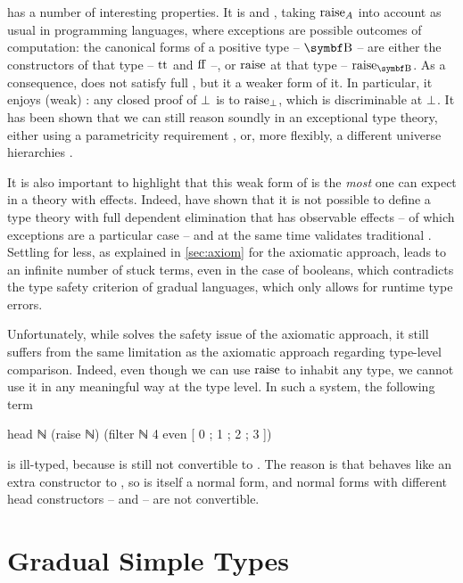 has a number of interesting properties. It is
 and , taking $\rai[A]$
into account as usual in programming languages,
where exceptions are possible outcomes of computation: the canonical forms
of a positive type – \eg $\Bool$ – are either the
constructors of that type – \eg $\operatorname{tt}$ and $\operatorname{ff}$ –, or
$\rai$ at that type – \eg $\rai[\Bool]$.
%
As a consequence,  does not satisfy full , but it
a weaker form of it. In particular, it enjoys
(weak) : any closed proof of $\operatorname{\bot}$ is 
to $\rai[\Empty]$, which is discriminable at $\operatorname{\bot}$.
%
It has been shown that we can still reason soundly in an
exceptional type theory, either using a parametricity
requirement , or, more flexibly, a
different universe hierarchies .

It is also important to highlight that this weak form of  is the \emph{most} one can expect in
a theory with effects. Indeed,  have
shown that it is not possible to define a type theory with full
dependent elimination%
that has observable effects – of which
exceptions are a particular case – and at the same time validates
traditional .
%
Settling for less, as explained in \cref{sec:axiom} for the axiomatic
approach, leads to an infinite number of stuck terms, even in the
case of booleans, which contradicts the type safety criterion of gradual languages,
which only allows for runtime type errors.

Unfortunately, while  solves the safety issue of the axiomatic approach, it still suffers from the same limitation as the axiomatic approach regarding type-level comparison.
Indeed, even though we can use $\rai$ to inhabit any type,
we cannot use it in any meaningful way at the type level.
In such a system, the following term
\begin{coqcode}
  head ℕ (raise ℕ) (filter ℕ 4 even [ 0 ; 1 ; 2 ; 3 ])
\end{coqcode}
is ill-typed, because  is still not convertible to
.
The reason is that  behaves like an extra constructor to , so
 is itself a normal form,
and normal forms with different head constructors
–  and  – are not convertible.

\section{Gradual Simple Types}
\label{sec:grad-simple}

